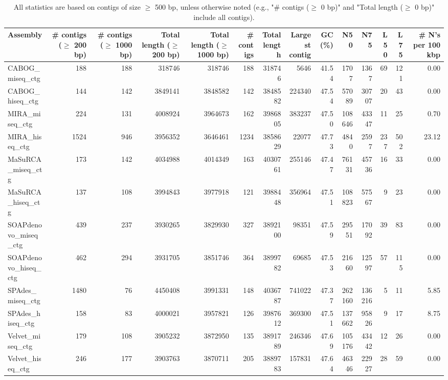 \documentclass[12pt,a4paper]{article}
\begin{document}
\begin{table}[ht]
\begin{center}
\caption{All statistics are based on contigs of size $\geq$ 500 bp, unless otherwise noted (e.g., "\# contigs ($\geq$ 0 bp)" and "Total length ($\geq$ 0 bp)" include all contigs).}
\begin{tabular}{|l*{13}{|r}|}
\hline
Assembly & \# contigs ($\geq$ 200 bp) & \# contigs ($\geq$ 1000 bp) & Total length ($\geq$ 200 bp) & Total length ($\geq$ 1000 bp) & \# contigs & Total length & Largest contig & GC (\%) & N50 & N75 & L50 & L75 & \# N's per 100 kbp \\ \hline
CABOG\_miseq\_ctg & 188 & 188 & 318746 & 318746 & 188 & 318746 & 5646 & 41.54 & 1707 & 1367 & 69 & 121 & 0.00 \\ \hline
CABOG\_hiseq\_ctg & 144 & 142 & 3849141 & 3848582 & 142 & 3848582 & 224340 & 47.54 & 57089 & 30707 & 20 & 43 & 0.00 \\ \hline
MIRA\_miseq\_ctg & 224 & 131 & 4008924 & 3964673 & 162 & 3986805 & 383237 & 47.50 & 108646 & 43347 & 11 & 25 & 0.70 \\ \hline
MIRA\_hiseq\_ctg & 1524 & 946 & 3956352 & 3646461 & 1234 & 3858629 & 22077 & 47.73 & 4840 & 2597 & 237 & 502 & 23.12 \\ \hline
MaSuRCA\_miseq\_ctg & 173 & 142 & 4034988 & 4014349 & 163 & 4030761 & 255146 & 47.47 & 76131 & 45736 & 16 & 33 & 0.00 \\ \hline
MaSuRCA\_hiseq\_ctg & 137 & 108 & 3994843 & 3977918 & 121 & 3988448 & 356964 & 47.51 & 108823 & 57567 & 9 & 23 & 0.00 \\ \hline
SOAPdenovo\_miseq\_ctg & 439 & 237 & 3930265 & 3829930 & 327 & 3892100 & 98351 & 47.59 & 29551 & 17092 & 39 & 83 & 0.00 \\ \hline
SOAPdenovo\_hiseq\_ctg & 462 & 294 & 3931705 & 3851746 & 364 & 3899782 & 69685 & 47.53 & 21660 & 12597 & 57 & 115 & 0.00 \\ \hline
SPAdes\_miseq\_ctg & 1480 & 76 & 4450408 & 3991331 & 148 & 4036787 & 741022 & 47.37 & 262160 & 136216 & 5 & 11 & 5.85 \\ \hline
SPAdes\_hiseq\_ctg & 158 & 83 & 4000021 & 3957821 & 126 & 3987612 & 369300 & 47.51 & 137662 & 95826 & 9 & 17 & 8.75 \\ \hline
Velvet\_miseq\_ctg & 179 & 108 & 3905232 & 3872950 & 135 & 3891789 & 246346 & 47.69 & 105176 & 43442 & 12 & 26 & 0.00 \\ \hline
Velvet\_hiseq\_ctg & 246 & 177 & 3903763 & 3870711 & 205 & 3889783 & 157831 & 47.64 & 46346 & 22927 & 28 & 59 & 0.00 \\ \hline

\end{tabular}
\end{center}
\end{table}
\end{document}
